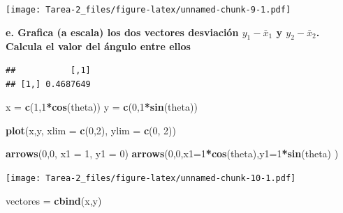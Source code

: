 \documentclass[
]{article}
\newenvironment{Shaded}{\begin{snugshade}}{\end{snugshade}}
\newcommand{\DataTypeTok}[1]{\textcolor[rgb]{0.13,0.29,0.53}{#1}}
\newcommand{\DecValTok}[1]{\textcolor[rgb]{0.00,0.00,0.81}{#1}}
\newcommand{\KeywordTok}[1]{\textcolor[rgb]{0.13,0.29,0.53}{\textbf{#1}}}
\newcommand{\NormalTok}[1]{#1}
\newcommand{\OperatorTok}[1]{\textcolor[rgb]{0.81,0.36,0.00}{\textbf{#1}}}
\newcommand{\StringTok}[1]{\textcolor[rgb]{0.31,0.60,0.02}{#1}}
\begin{document}
\texttt{[image: Tarea-2\_files/figure-latex/unnamed-chunk-9-1.pdf]}

\textbf{e. Grafica (a escala) los dos vectores desviación
\(y_1-\bar{x}_1\) y \(y_2-\bar{x}_2\). Calcula el valor del ángulo entre
ellos}

\begin{Shaded}
\end{Shaded}

\begin{verbatim}
##           [,1]
## [1,] 0.4687649
\end{verbatim}

\begin{Shaded}
\begin{Highlighting}[]
\NormalTok{  x =}\StringTok{ }\KeywordTok{c}\NormalTok{(}\DecValTok{1}\NormalTok{,}\DecValTok{1}\OperatorTok{*}\KeywordTok{cos}\NormalTok{(theta))}
\NormalTok{  y =}\StringTok{ }\KeywordTok{c}\NormalTok{(}\DecValTok{0}\NormalTok{,}\DecValTok{1}\OperatorTok{*}\KeywordTok{sin}\NormalTok{(theta))}
  
  \KeywordTok{plot}\NormalTok{(x,y, }\DataTypeTok{xlim =} \KeywordTok{c}\NormalTok{(}\DecValTok{0}\NormalTok{,}\DecValTok{2}\NormalTok{), }\DataTypeTok{ylim =} \KeywordTok{c}\NormalTok{(}\DecValTok{0}\NormalTok{, }\DecValTok{2}\NormalTok{))}
  
  \KeywordTok{arrows}\NormalTok{(}\DecValTok{0}\NormalTok{,}\DecValTok{0}\NormalTok{, }\DataTypeTok{x1 =} \DecValTok{1}\NormalTok{, }\DataTypeTok{y1 =} \DecValTok{0}\NormalTok{)}
  \KeywordTok{arrows}\NormalTok{(}\DecValTok{0}\NormalTok{,}\DecValTok{0}\NormalTok{,}\DataTypeTok{x1=}\DecValTok{1}\OperatorTok{*}\KeywordTok{cos}\NormalTok{(theta),}\DataTypeTok{y1=}\DecValTok{1}\OperatorTok{*}\KeywordTok{sin}\NormalTok{(theta) )}
\end{Highlighting}
\end{Shaded}

\texttt{[image: Tarea-2\_files/figure-latex/unnamed-chunk-10-1.pdf]}

\begin{Shaded}
\begin{Highlighting}[]
\NormalTok{  vectores =}\StringTok{ }\KeywordTok{cbind}\NormalTok{(x,y)}
\end{Highlighting}
\end{Shaded}
\end{document}
